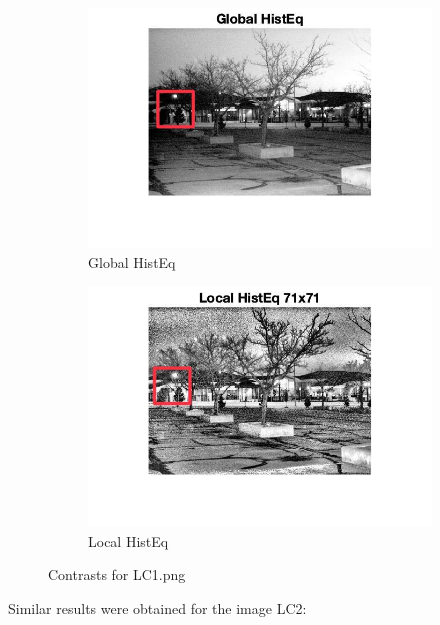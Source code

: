 \documentclass[12pt]{article}
\begin{document}
\begin{figure}[h!]
        \begin{subfigure}[b]{0.4\textwidth}
            \centering
            \includegraphics[width=\textwidth]{../images/LC1_globalHistEq_2.jpeg}
            \caption{Global HistEq}
        \end{subfigure}
        \hfill
        \begin{subfigure}[b]{0.4\textwidth}
            \centering
            \includegraphics[width=\textwidth]{../images/LC1_localHistEq_2.jpeg}
            \caption{Local HistEq}
        \end{subfigure}
    
        \caption{Contrasts for LC1.png}
    \end{figure}
    \newpage
    Similar results were obtained for the image LC2:
\end{document}
